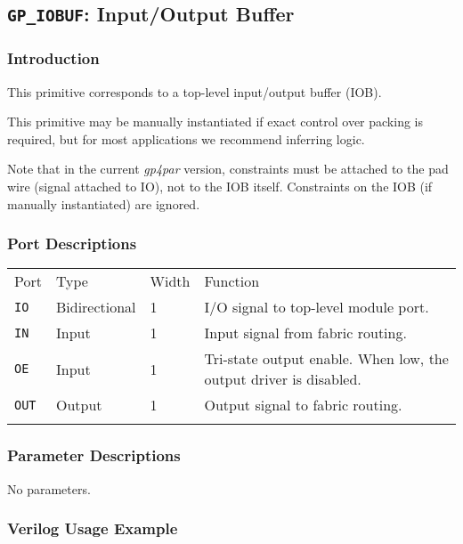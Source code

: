 \documentclass[11pt]{article}
\newcommand{\namestyle}[1]{\textit{#1}}
\newcommand{\tokenstyle}[1]{\texttt{#1}}
\newcommand{\whenstyle}[1]{{\fontseries{sb}\selectfont#1}}
\newcommand{\thinhline}{\Xhline{1\arrayrulewidth}}
\newcommand{\thickhline}{\Xhline{2.5\arrayrulewidth}}
\begin{document}
\pagebreak
\subsection{\tokenstyle{GP\_IOBUF}: Input/Output Buffer}
\label{gp-iobuf}

\subsubsection{Introduction}
This primitive corresponds to a top-level input/output buffer (IOB).

This primitive may be manually instantiated if exact control over packing is required, but for most applications we
recommend inferring logic.

Note that in the current \namestyle{gp4par} version, constraints must be attached to the pad wire (signal attached to IO), not to the IOB itself. Constraints on the IOB (if manually instantiated) are ignored.

\subsubsection{Port Descriptions}

\begin{tabularx}{\textwidth}{lllX}
\thinhline
\whenstyle{Port} & \whenstyle{Type} & \whenstyle{Width} & \whenstyle{Function} \\
\thickhline
\tokenstyle{IO} & Bidirectional & 1 & I/O signal to top-level module port. \\
\thinhline
\tokenstyle{IN} & Input & 1 & Input signal from fabric routing. \\
\thinhline
\tokenstyle{OE} & Input & 1 & Tri-state output enable. When low, the output driver is disabled. \\
\thinhline
\tokenstyle{OUT} & Output & 1 & Output signal to fabric routing. \\
\thinhline
\end{tabularx}

\subsubsection{Parameter Descriptions}

No parameters.

\subsubsection{Verilog Usage Example}
\end{document}
